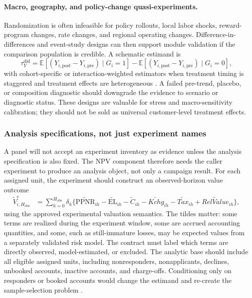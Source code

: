 \documentclass[11pt]{article}
\newcommand{\E}{\mathbb{E}}
\newcommand{\EL}{\mathrm{EL}}
\newcommand{\PPNR}{\mathrm{PPNR}}
\newcommand{\1}{\mathbf{1}}
\begin{document}
\paragraph{Macro, geography, and policy-change quasi-experiments.}
Randomization is often infeasible for policy rollouts, local labor shocks,
reward-program changes, rate changes, and regional operating changes.
Difference-in-differences and event-study designs can then support module
validation if the comparison population is credible. A schematic estimand is
\begin{equation}
  \tau^{\mathrm{did}}_Y
  =
  \E[(Y_{i,\mathrm{post}}-Y_{i,\mathrm{pre}})\mid G_i=1]
  -
  \E[(Y_{i,\mathrm{post}}-Y_{i,\mathrm{pre}})\mid G_i=0],
  \label{eq:did-estimand}
\end{equation}
with cohort-specific or interaction-weighted estimators when treatment timing
is staggered and treatment effects are heterogeneous
\citep{callaway2021did,sun2021eventstudy}. A failed pre-trend, placebo, or
composition diagnostic should downgrade the evidence to scenario or diagnostic
status. These designs are valuable for stress and macro-sensitivity
calibration; they should not be sold as universal customer-level treatment
effects.

\subsubsection{Analysis specifications, not just experiment names}

A panel will not accept an experiment inventory as evidence unless the analysis
specification is also fixed. The NPV component therefore needs the caller
experiment to produce an analysis object, not only a campaign result. For each
assigned unit, the experiment should construct an observed-horizon value
outcome
\begin{align}
  \widetilde{V}^{e}_{i,H_{\mathrm{obs}}}
  &=
  \sum_{h=0}^{H_{\mathrm{obs}}}\delta_h
  \{\widetilde{\PPNR}_{ih}
    -\widetilde{\EL}_{ih}
    -\widetilde{C}_{ih}
    -\widetilde{Kchg}_{ih}
    -\widetilde{Tax}_{ih}
    +\widetilde{RelValue}_{ih}\},
  \label{eq:experiment-constructed-value}
\end{align}
using the approved experimental valuation semantics. The tildes matter: some
terms are realized during the experiment window, some are accrued accounting
quantities, and some, such as still-immature losses, may be expected values
from a separately validated risk model. The contract must label which terms
are directly observed, model-estimated, or excluded. The analytic base should
include all eligible assigned units, including nonresponders, nonapplicants,
declines, unbooked accounts, inactive accounts, and charge-offs. Conditioning
only on responders or booked accounts would change the estimand and re-create
the sample-selection problem \citep{heckman1979selection}.
\end{document}
